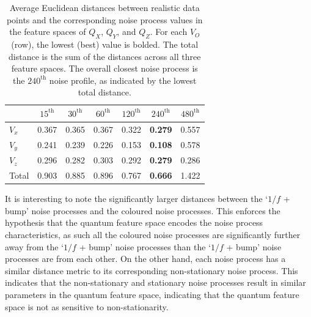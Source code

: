 \documentclass[12pt]{iopart}
\begin{document}
\begin{table}[ht]
    \centering
    \begin{tabular}{lcccccc}
        \toprule
              & $15^\mathrm{th}$ & $30^\mathrm{th}$ & $60^\mathrm{th}$ & $120^\mathrm{th}$ & $240^\mathrm{th}$ & $480^\mathrm{th}$ \\
        \midrule
        $V_x$ & 0.367            & 0.365            & 0.367            & 0.322             & \textbf{0.279}    & 0.557             \\
        $V_y$ & 0.241            & 0.239            & 0.226            & 0.153             & \textbf{0.108}    & 0.578             \\
        $V_z$ & 0.296            & 0.282            & 0.303            & 0.292             & \textbf{0.279}    & 0.286             \\
        \midrule
        Total & 0.903            & 0.885            & 0.896            & 0.767             & \textbf{0.666}    & 1.422             \\
        \bottomrule
    \end{tabular}
    \caption{Average Euclidean distances between realistic data points and the corresponding noise process values in the feature spaces of \(Q_X\), \(Q_Y\), and \(Q_Z\). For each \(V_O\) (row), the lowest (best) value is bolded. The total distance is the sum of the distances across all three feature spaces. The overall closest noise process is the $240^\mathrm{th}$ noise profile, as indicated by the lowest total distance.}
    \label{tab:noise_profiles2}
\end{table}

It is interesting to note the significantly larger distances between the `$1/f$ + bump' noise processes and the coloured noise processes. This enforces the hypothesis that the quantum feature space encodes the noise process characteristics, as such all the coloured noise processes are significantly further away from the `$1/f$ + bump' noise processes than the `$1/f$ + bump' noise processes are from each other. On the other hand, each noise process has a similar distance metric to its corresponding non-stationary noise process. This indicates that the non-stationary and stationary noise processes result in similar parameters in the quantum feature space, indicating that the quantum feature space is not as sensitive to non-stationarity.
\end{document}
